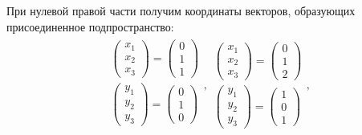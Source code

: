 \documentclass[12pt]{article}
\begin{document}
    При нулевой правой части получим координаты векторов, образующих присоединенное подпространство:
    \begin{gather*}
        \begin{array}{c}
            \begin{pmatrix}
                x_1 \\ x_2 \\ x_3
            \end{pmatrix}
            =
            \begin{pmatrix}
                0 \\ 1 \\ 1
            \end{pmatrix}             \\
            \begin{pmatrix}
                y_1 \\ y_2 \\ y_3
            \end{pmatrix}
            =
            \begin{pmatrix}
                0 \\ 1 \\ 0
            \end{pmatrix} \\
        \end{array} ,
        \begin{array}{c}
            \begin{pmatrix}
                x_1 \\ x_2 \\ x_3
            \end{pmatrix}
            =
            \begin{pmatrix}
                0 \\ 1 \\ 2
            \end{pmatrix}             \\
            \begin{pmatrix}
                y_1 \\ y_2 \\ y_3
            \end{pmatrix}
            =
            \begin{pmatrix}
                1 \\ 0 \\ 1
            \end{pmatrix}
        \end{array} ,
    \end{gather*}
\end{document}
